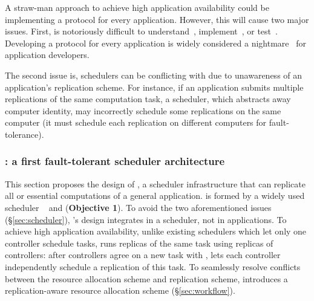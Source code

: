 A straw-man approach to achieve high application availability could be 
implementing a \paxos protocol for every application. However, this will cause 
two major issues. First, \paxos is notoriously difficult to 
understand~\cite{raft:usenix14,paxos:simple}, implement~\cite{paxos:practical, 
paxos:live}, or test~\cite{modist:nsdi09,demeter:sosp11}. Developing a 
\paxos protocol for every application is widely considered a 
nightmare~\cite{modist:nsdi09,demeter:sosp11,paxos:live} for application 
developers.

The second issue is, schedulers can be conflicting with \paxos due to 
unawareness of an application's \paxos replication scheme. For instance, if an 
application submits multiple replications of the same computation task, a 
scheduler, which abstracts away computer identity, may incorrectly schedule 
some replications on the same computer (it must schedule each replication 
on different computers for \paxos fault-tolerance).

\vspace{-.15in}\subsubsection{\tripod: a first fault-tolerant scheduler 
architecture} 
\label{sec:scheduler-arch}\vspace{-.075in}

This section proposes the design of \tripod, a scheduler infrastructure that 
can replicate all or essential computations of a general application. 
\tripod is formed by a widely used scheduler \mesos~\cite{mesos:nsdi11} and 
\falcon (\textbf{Objective 1}). To avoid the two aforementioned issues 
(\S\ref{sec:scheduler}), \tripod's design integrates \paxos in a scheduler, 
not in applications. To achieve high application availability, unlike existing 
schedulers which let only one controller schedule tasks, \tripod runs replicas 
of the same task using replicas of controllers: after controllers agree on a 
new task with \falcon, \tripod lets each controller independently schedule a 
replication of this task. To seamlessly resolve conflicts between the resource 
allocation scheme and replication scheme, \tripod introduces a 
replication-aware 
resource allocation scheme (\S\ref{sec:workflow}).



